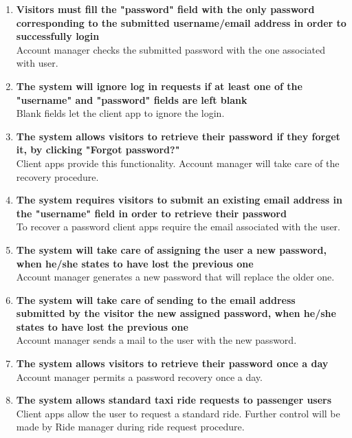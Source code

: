 \begin{enumerate}
	\item \textbf{Visitors must fill the "password" field with the only password corresponding to the submitted username/email address in order to successfully login}\\
	Account manager checks the submitted password with the one associated with user.
	
	\item \textbf{The system will ignore log in requests if at least one of the "username" and "password" fields are left blank}\\
	Blank fields let the client app to ignore the login.	
	
	\item \textbf{The system allows visitors to retrieve their password if they forget it, by clicking "Forgot password?"}\\
	Client apps provide this functionality. Account manager will take care of the recovery procedure.
	
	\item \textbf{The system requires visitors to submit an existing email address in the "username" field in order to retrieve their password}\\
	To recover a password client apps require the email associated with the user.
	
	\item \textbf{The system will take care of assigning the user a new password, when he/she states to have lost the previous one}\\
	Account manager generates a new password that will replace the older one. 
	
	\item \textbf{The system will take care of sending to the email address submitted by the visitor the new assigned password, when he/she states to have lost the previous one}\\
	Account manager sends a mail to the user with the new password.
	
	\item \textbf{The system allows visitors to retrieve their password once a day}\\
	Account manager permits a password recovery once a day.
	
	\item \textbf{The system allows standard taxi ride requests to passenger users}\\
	Client apps allow the user to request a standard ride. Further control will be made by Ride manager during ride request procedure.
	

\end{enumerate}
